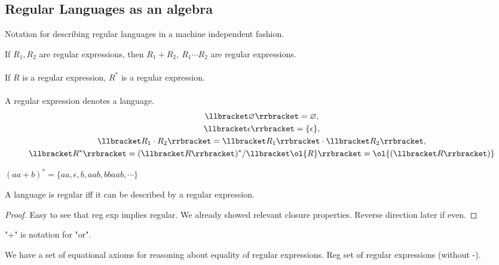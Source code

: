 \documentclass[class=scrartcl, crop=false]{standalone}
\begin{document}
\subsection{Regular Languages as an algebra}

\begin{definition}
  Notation for describing regular languages in a machine independent fashion.
  \begin{enumerate}
    \ii If $R_1, R_2$ are regular expressions, then $R_1 + R_2, \ R_1 \cdots
    R_2$ are regular expressions.
    \\\\
    If $R$ is a regular expression, $R^*$ is a regular expression.
    \\\\
    A regular expression denotes a language.
    \begin{gather*}
      \llbracket \varnothing \rrbracket = \varnothing, \\
      \llbracket \epsilon \rrbracket = \{\epsilon\}, \\
      \llbracket R_1 \cdot R_2 \rrbracket = \llbracket R_1 \rrbracket \cdot \llbracket R_2 \rrbracket, \\
      \llbracket R^* \rrbracket = (\llbracket R \rrbracket)^* / \llbracket
      \ol{R} \rrbracket = \ol{(\llbracket R \rrbracket)}
    \end{gather*}
    \begin{example}
      $(aa + b)^* = \{aa, \epsilon, b, aab, bbaab, \cdots \}$
    \end{example}
  \end{enumerate}
  \begin{theorem}
    A language is regular iff it can be described by a regular expression.
    \begin{proof}
      Easy to see that reg exp implies regular. We already showed relevant
      closure properties. Reverse direction later if even.
    \end{proof}
  \end{theorem}
  \begin{note}
    "+" is notation for "or".
  \end{note}
  We have a set of equational axioms for reasoning about equality of regular
  expressions. Reg set of regular expressions (without -). \\ %

\end{definition}
\end{document}
